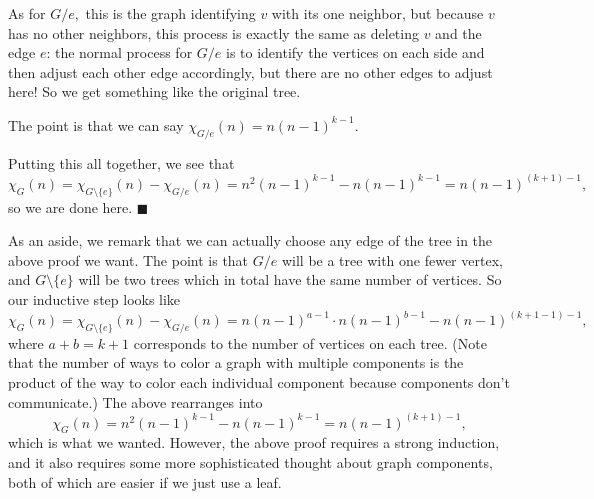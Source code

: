 As for $G/e,$ this is the graph identifying $v$ with its one neighbor, but because $v$ has no other neighbors, this process is exactly the same as deleting $v$ and the edge $e$: the normal process for $G/e$ is to identify the vertices on each side and then adjust each other edge accordingly, but there are no other edges to adjust here! So we get something like the original tree.
\begin{center}
\end{center}
The point is that we can say $\chi_{G/e}(n)=n(n-1)^{k-1}.$

Putting this all together, we see that
\[\chi_G(n)=\chi_{G\setminus\{e\}}(n)-\chi_{G/e}(n)=n^2(n-1)^{k-1}-n(n-1)^{k-1}=n(n-1)^{(k+1)-1},\]
so we are done here. $\blacksquare$

As an aside, we remark that we can actually choose any edge of the tree in the above proof we want. The point is that $G/e$ will be a tree with one fewer vertex, and $G\setminus\{e\}$ will be two trees which in total have the same number of vertices. So our inductive step looks like
\[\chi_G(n)=\chi_{G\setminus\{e\}}(n)-\chi_{G/e}(n)=n(n-1)^{a-1}\cdot n(n-1)^{b-1}-n(n-1)^{(k+1-1)-1},\]
where $a+b=k+1$ corresponds to the number of vertices on each tree. (Note that the number of ways to color a graph with multiple components is the product of the way to color each individual component because components don't communicate.) The above rearranges into
\[\chi_G(n)=n^2(n-1)^{k-1}-n(n-1)^{k-1}=n(n-1)^{(k+1)-1},\]
which is what we wanted. However, the above proof requires a strong induction, and it also requires some more sophisticated thought about graph components, both of which are easier if we just use a leaf.

